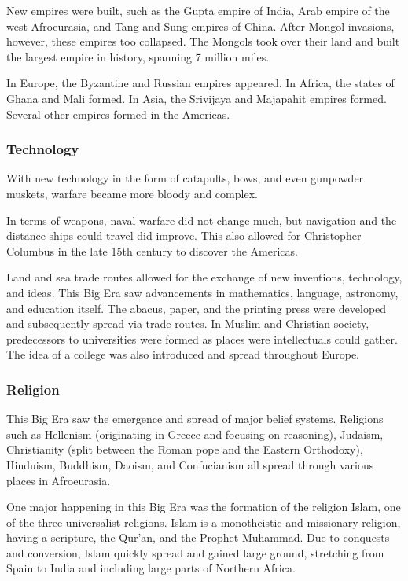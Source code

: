 \documentclass[11pt]{article}
\begin{document}
New empires were built, such as the Gupta empire of India, Arab empire of the west Afroeurasia, and Tang and Sung empires of China. After Mongol invasions, however, these empires too collapsed. The Mongols took over their land and built the largest empire in history, spanning 7 million miles.

In Europe, the Byzantine and Russian empires appeared. In Africa, the states of Ghana and Mali formed. In Asia, the Srivijaya and Majapahit empires formed. Several other empires formed in the Americas.

\subsubsection{Technology}
\label{sec:orgeb91d6f}

With new technology in the form of catapults, bows, and even gunpowder muskets, warfare became more bloody and complex.

In terms of weapons, naval warfare did not change much, but navigation and the distance ships could travel did improve. This also allowed for Christopher Columbus in the late 15th century to discover the Americas.

Land and sea trade routes allowed for the exchange of new inventions, technology, and ideas. This Big Era saw advancements in mathematics, language, astronomy, and education itself. The abacus, paper, and the printing press were developed and subsequently spread via trade routes. In Muslim and Christian society, predecessors to universities were formed as places were intellectuals could gather. The idea of a college was also introduced and spread throughout Europe.

\subsubsection{Religion}
\label{sec:orgfdd7453}

This Big Era saw the emergence and spread of major belief systems. Religions such as Hellenism (originating in Greece and focusing on reasoning), Judaism, Christianity (split between the Roman pope and the Eastern Orthodoxy), Hinduism, Buddhism, Daoism, and Confucianism all spread through various places in Afroeurasia.

One major happening in this Big Era was the formation of the religion Islam, one of the three universalist religions. Islam is a monotheistic and missionary religion, having a scripture, the Qur'an, and the Prophet Muhammad. Due to conquests and conversion, Islam quickly spread and gained large ground, stretching from Spain to India and including large parts of Northern Africa.
\end{document}
